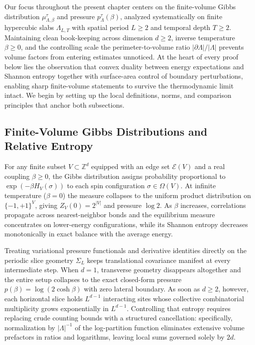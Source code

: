 \documentclass[11pt]{article}
\theoremstyle{definition}
\begin{document}
Our focus throughout the present chapter centers on the finite-volume Gibbs
distribution $\mu_{\Lambda,\beta}^\tau$ and pressure $p_\Lambda^\tau(\beta)$,
analyzed systematically on finite hypercubic slabs $\Lambda_{L,T}$ with spatial
period $L \ge 2$ and temporal depth $T \ge 2$. Maintaining clean book-keeping across
dimension $d \ge 2$, inverse temperature $\beta \ge 0$, and the controlling scale
the perimeter-to-volume ratio $|\partial \Lambda|/|\Lambda|$ prevents volume factors
from entering estimates unnoticed. At the heart of every proof below lies the
observation that convex duality between energy expectations and Shannon entropy
together with surface-area control of boundary perturbations, enabling sharp
finite-volume statements to survive the thermodynamic limit intact. We begin by
setting up the local definitions, norms, and comparison principles that anchor both
subsections.

\subsection{Finite-Volume Gibbs Distributions and Relative Entropy}
\label{subsec:s02a}

For any finite subset $V \subset \mathbb{Z}^d$ equipped with an edge set
$\mathcal{E}(V)$ and a real coupling $\beta \ge 0$, the Gibbs distribution assigns
probability proportional to $\exp(-\beta H_V(\sigma))$ to each spin configuration
$\sigma \in \Omega(V)$. At infinite temperature ($\beta = 0$) the measure collapses
to the uniform product distribution on $\{-1, +1\}^V$, giving $Z_V(0) = 2^{|V|}$ and
pressure $\log 2$. As $\beta$ increases, correlations propagate across
nearest-neighbor bonds and the equilibrium measure concentrates on lower-energy
configurations, while its Shannon entropy decreases monotonically in exact balance
with the average energy.

Treating variational pressure functionals and derivative identities directly on the
periodic slice geometry $\Sigma_L$ keeps translational covariance manifest at every
intermediate step. When $d = 1$, transverse geometry disappears altogether and the
entire setup collapses to the exact closed-form pressure $p(\beta) = \log(2 \cosh
\beta)$ with zero lateral boundary. As soon as $d \ge 2$, however, each horizontal
slice holds $L^{d-1}$ interacting sites whose collective combinatorial multiplicity
grows exponentially in $L^{d-1}$. Controlling that entropy requires replacing crude
counting bounds with a structured cancellation: specifically, normalization by
$|\Lambda|^{-1}$ of the log-partition function eliminates extensive volume
prefactors in ratios and logarithms, leaving local sums governed solely by $2d$.
\end{document}
